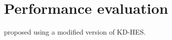 \section{Performance evaluation}%
\label{Performance}

\Textcite{ANOBE} proposed using a modified version of \ac{KD-HES}.
